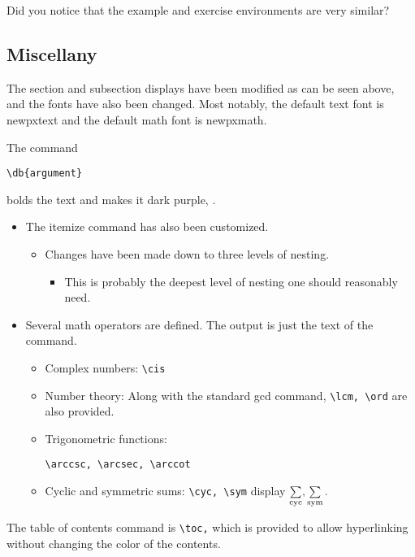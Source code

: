 \documentclass{article}
\begin{document}
\begin{exer}
Did you notice that the example and exercise environments are very similar?
\end{exer}

\subsection{Miscellany}

The section and subsection displays have been modified as can be seen above, and the fonts have also been changed. Most notably, the default text font is newpxtext and the default math font is newpxmath.

The command

\begin{verbatim}
\db{argument}
\end{verbatim}

bolds the text and makes it dark purple, .

\begin{itemize}
\item The itemize command has also been customized.
\begin{itemize}
\item Changes have been made down to three levels of nesting.
\begin{itemize}
\item This is probably the deepest level of nesting one should reasonably need.
\end{itemize}
\end{itemize}
\item Several math operators are defined. The output is just the text of the command.
\begin{itemize}
\item Complex numbers: \verb|\cis|
\item Number theory: Along with the standard gcd command, \verb|\lcm, \ord| are also provided.
\item Trigonometric functions: \begin{verbatim}
\arccsc, \arcsec, \arccot
\end{verbatim}
\item Cyclic and symmetric sums: \verb|\cyc, \sym| display $\sum\limits_{\text{cyc}}, \sum\limits_{\text{sym}}.$
\end{itemize}
\end{itemize}

The table of contents command is \verb|\toc,| which is provided to allow hyperlinking without changing the color of the contents.
\end{document}

